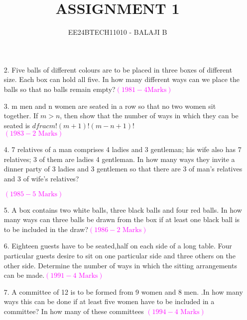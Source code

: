 \documentclass[journal,12pt,twocolumn]{IEEEtran}
\theoremstyle{remark}
\begin{document}

\vspace{3cm}

\title{ASSIGNMENT 1}
\author{EE24BTECH11010 - BALAJI B}
\maketitle
\newpage
\bigskip

\renewcommand{\thefigure}{\theenumi}
\renewcommand{\thetable}{\theenumi}
\begin{enumerate}
    \item[2.\hspace{0.5cm}] Five balls of different colours are to be placed in three boxes of different size. Each box can hold all five. In how many different ways can we place the balls so that no balls remain empty?\hfill \textcolor{magenta}{$(1981- 4 \text{Marks})$}
    \item[3.\hspace{0.5cm}] m men and n women are seated in a row so that no two women sit together. If $m>n$, then show that the number of ways in which they can be seated is $dfrac{m!(m+1)!}{(m-n+1)!}$ \\

    \hfill \textcolor{magenta}{$(1983-2\text{ Marks})$}
    \item[4. \hspace{0.5cm}] 7 relatives of a man comprises 4 ladies and 3 gentleman; his wife also has 7 relatives; 3 of them are ladies 4 gentleman. In how many ways they invite a dinner party of 3 ladies and 3 gentlemen so that there are 3 of man's relatives and 3 of wife's relatives?
    
    \hfill \textcolor{magenta}{$(1985- 5 \text{ Marks})$}
    \item[5.\hspace{0.5cm}]A box contains two white balls, three black balls and four red balls. In how many ways can three balls be drawn from the box if at least one black ball is to be included in the draw?\hfill \textcolor{magenta}{$(1986-2\text{ Marks})$}  
    \item[6. \hspace{0.5cm}] Eighteen guests have to be seated,half on each side of a long table. Four particular guests desire to sit on one particular side and three others on the other side. Determine the number of ways in which the sitting arrangements can be made.\hfill \textcolor{magenta}{$(1991-4\text{ Marks})$}
    \item[7.\hspace{0.5cm}]A committee of 12 is to be formed from 9 women and 8 men. .In how many ways this can be done if at least five women have to be included in a committee? In how many of these committees \hfill \textcolor{magenta}{$(1994- 4 \text{ Marks})$}


\end{enumerate}
\end{document}
